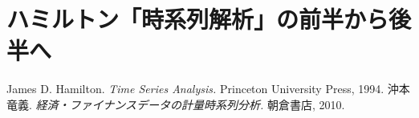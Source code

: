 \documentclass[b5paper,xelatex,ja=standard,10pt]{bxjsarticle}
\begin{document}


\part*{ハミルトン「時系列解析」の前半から後半へ}

\begin{spacing}{0.5}
\tableofcontents
\end{spacing}

\begin{thebibliography}{99}
     James D. Hamilton. \textit{Time Series Analysis.} Princeton University Press, 1994.
     沖本 竜義. \textit{経済・ファイナンスデータの計量時系列分析.} 朝倉書店, 2010.
\end{thebibliography}
\vspace{3pt}
\end{document}
